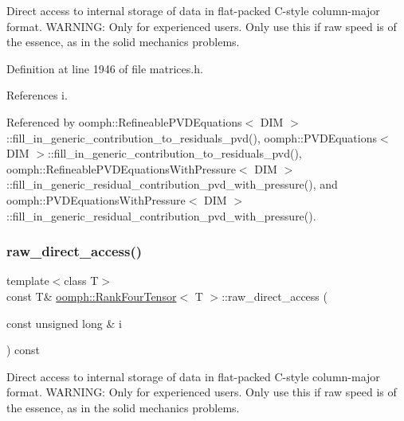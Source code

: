 Direct access to internal storage of data in flat-\/packed C-\/style column-\/major format. W\+A\+R\+N\+I\+NG\+: Only for experienced users. Only use this if raw speed is of the essence, as in the solid mechanics problems. 



Definition at line 1946 of file matrices.\+h.



References i.



Referenced by oomph\+::\+Refineable\+P\+V\+D\+Equations$<$ D\+I\+M $>$\+::fill\+\_\+in\+\_\+generic\+\_\+contribution\+\_\+to\+\_\+residuals\+\_\+pvd(), oomph\+::\+P\+V\+D\+Equations$<$ D\+I\+M $>$\+::fill\+\_\+in\+\_\+generic\+\_\+contribution\+\_\+to\+\_\+residuals\+\_\+pvd(), oomph\+::\+Refineable\+P\+V\+D\+Equations\+With\+Pressure$<$ D\+I\+M $>$\+::fill\+\_\+in\+\_\+generic\+\_\+residual\+\_\+contribution\+\_\+pvd\+\_\+with\+\_\+pressure(), and oomph\+::\+P\+V\+D\+Equations\+With\+Pressure$<$ D\+I\+M $>$\+::fill\+\_\+in\+\_\+generic\+\_\+residual\+\_\+contribution\+\_\+pvd\+\_\+with\+\_\+pressure().

\mbox{\label{classoomph_1_1RankFourTensor_a92c57d9b49eff2f3bd6759ead3a98414}} 
\subsubsection{\texorpdfstring{raw\+\_\+direct\+\_\+access()}{raw\_direct\_access()}\hspace{0.1cm}{\footnotesize\ttfamily [2/2]}}
{\footnotesize\ttfamily template$<$class T$>$ \\
const T\& \hyperlink{classoomph_1_1RankFourTensor}{oomph\+::\+Rank\+Four\+Tensor}$<$ T $>$\+::raw\+\_\+direct\+\_\+access (\begin{DoxyParamCaption}\item[{const unsigned long \&}]{i }\end{DoxyParamCaption}) const\hspace{0.3cm}{\ttfamily [inline]}}



Direct access to internal storage of data in flat-\/packed C-\/style column-\/major format. W\+A\+R\+N\+I\+NG\+: Only for experienced users. Only use this if raw speed is of the essence, as in the solid mechanics problems. 



